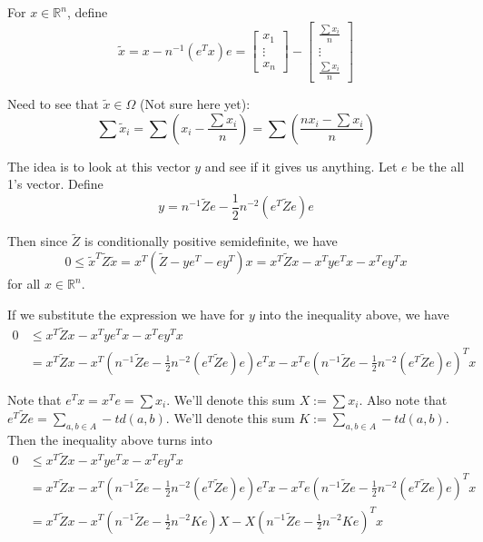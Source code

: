 \documentclass[11pt]{article}
\theoremstyle{definition}
\theoremstyle{definition}
\theoremstyle{plain}
\theoremstyle{plain}
\theoremstyle{plain}
\theoremstyle{definition}
\begin{document}
For $x \in \mathbb{R}^n$, define
\begin{equation*}
\tilde{x} = x - n^{-1}(e^Tx)e = \begin{bmatrix} x_1 \\ \vdots \\ x_n \end{bmatrix} - \begin{bmatrix} \frac{\sum x_i}{n} \\ \vdots \\ \frac{\sum x_i}{n} \end{bmatrix}
\end{equation*}

Need to see that $\tilde{x} \in \Omega$ (Not sure here yet):
\begin{equation*}
\sum \tilde{x}_i = \sum \left(x_i - \frac{\sum x_i}{n}\right) = \sum\left(\frac{nx_i - \sum x_i}{n}\right)
\end{equation*}

The idea is to look at this vector $y$ and see if it gives us anything. Let $e$ be the all 1's vector. Define
\begin{equation*}
y = n^{-1}\tilde{Z}e - \frac{1}{2}n^{-2}(e^T\tilde{Z}e)e
\end{equation*}

Then since $\tilde{Z}$ is conditionally positive semidefinite, we have
\begin{equation*}
0 \leq \tilde{x}^T\tilde{Z}\tilde{x} = x^T(\tilde{Z} - ye^T - ey^T)x = x^T\tilde{Z}x - x^Tye^Tx - x^Tey^Tx
\end{equation*}
for all $x \in \mathbb{R}^n$.

If we substitute the expression we have for $y$ into the inequality above, we have
\begin{align*}
0 &\leq x^T\tilde{Z}x - x^Tye^Tx - x^Tey^Tx \\
&= x^T\tilde{Z}x - x^T\left(n^{-1}\tilde{Z}e - \frac{1}{2}n^{-2}(e^T\tilde{Z}e)e\right)e^Tx - x^Te\left(n^{-1}\tilde{Z}e-\frac{1}{2}n^{-2}(e^T\tilde{Z}e)e\right)^Tx
\end{align*}

Note that $e^Tx = x^Te = \sum x_i$. We'll denote this sum $X:=\sum x_i$. Also note that $e^T\tilde{Z}e = \sum\limits_{a,b\in A} -td(a,b)$. We'll denote this sum $K := \sum\limits_{a,b\in A} -td(a,b)$. Then the inequality above turns into
\begin{align*}
0 &\leq x^T\tilde{Z}x - x^Tye^Tx - x^Tey^Tx \\
&= x^T\tilde{Z}x - x^T\left(n^{-1}\tilde{Z}e - \frac{1}{2}n^{-2}(e^T\tilde{Z}e)e\right)e^Tx - x^Te\left(n^{-1}\tilde{Z}e-\frac{1}{2}n^{-2}(e^T\tilde{Z}e)e\right)^Tx \\
&= x^T\tilde{Z}x - x^T\left(n^{-1}\tilde{Z}e - \frac{1}{2}n^{-2}Ke\right)X - X\left(n^{-1}\tilde{Z}e-\frac{1}{2}n^{-2}Ke\right)^Tx
\end{align*}
\end{document}
